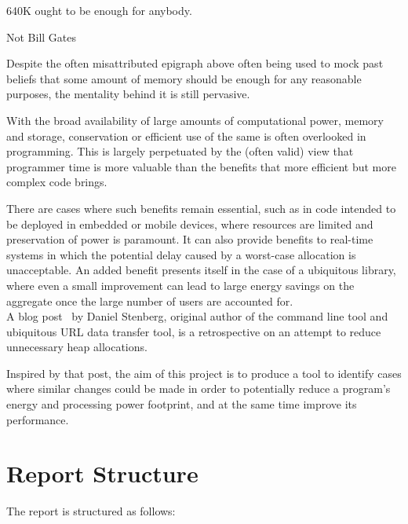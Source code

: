 \epigraph{640K ought to be enough for anybody.}{Not Bill Gates}

Despite the often misattributed epigraph above often being used to mock past beliefs that some amount of memory should be enough for any reasonable purposes, the mentality behind it is still pervasive.

With the broad availability of large amounts of computational power, memory and storage, conservation or efficient use of the same is often overlooked in programming. This is largely perpetuated by the (often valid) view that programmer time is more valuable than the benefits that more efficient but more complex code brings.

There are cases where such benefits remain essential, such as in code intended to be deployed in embedded or mobile devices, where resources are limited and preservation of power is paramount. It can also provide benefits to real-time systems in which the potential delay caused by a worst-case allocation is unacceptable. An added benefit presents itself in the case of a ubiquitous library, where even a small improvement can lead to large energy savings on the aggregate once the large number of users are accounted for.\\
A blog post~\cite{curlmalloc} by Daniel Stenberg, original author of the  command line tool and ubiquitous URL data transfer tool, is a retrospective on an attempt to reduce unnecessary heap allocations.

Inspired by that post, the aim of this project is to produce a tool to identify cases where similar changes could be made in order to potentially reduce a program's energy and processing power footprint, and at the same time improve its performance.

\section{Report Structure}

The report is structured as follows:

